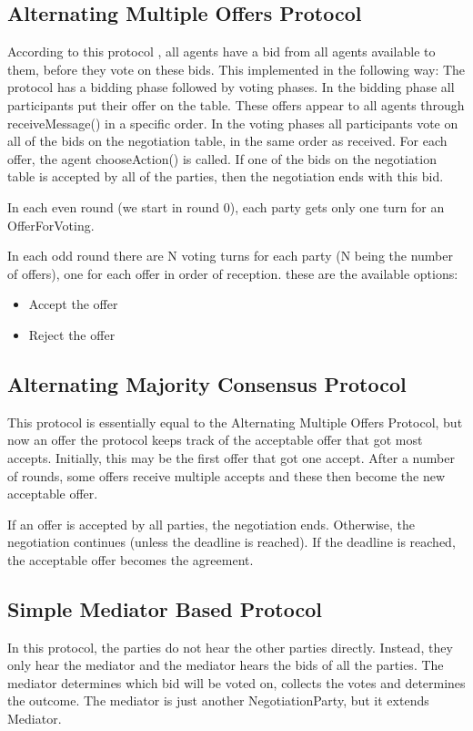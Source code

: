 \documentclass[]{article}
\begin{document}
\subsection{Alternating Multiple Offers Protocol}
According to this protocol \cite{MultilateralOffersProtocols} , all agents have a bid from all agents available to them, before they vote on these bids. This implemented in the following way: The protocol has a bidding phase followed by voting phases. In the bidding phase all participants put their offer on the table. These offers appear to all agents through receiveMessage() in a specific order. In the voting phases all participants vote on all of the bids on the negotiation table, in the same order as received. For each offer, the agent chooseAction() is called. If one of the bids on the negotiation table is accepted by all of the parties, then the negotiation ends with this bid. 

In each even round (we start in round 0), each party gets only one turn for an OfferForVoting. 

In each odd round there are N voting turns for each party (N being the number of offers), one for each offer in order of reception. these are the available options:
\begin{itemize}
\item Accept the offer
\item Reject the offer
\end{itemize}


\subsection{Alternating Majority Consensus Protocol}

This protocol is essentially equal to the Alternating Multiple Offers Protocol, but now an offer the protocol keeps track of the acceptable offer that got most accepts.
Initially, this may be the first offer that got one accept. After a number of rounds, some offers receive multiple accepts and these then become the new acceptable offer.

If an offer is accepted by all parties, the negotiation ends. Otherwise, the negotiation continues (unless the deadline is reached). If the deadline is reached, the acceptable offer becomes the agreement.
 
 
\subsection{Simple Mediator Based Protocol}
In this protocol, the parties do not hear the other parties directly. Instead, they only hear the mediator and the mediator hears the bids of all the parties. The mediator determines which bid will be voted on, collects the votes and determines the outcome. The mediator is just another NegotiationParty, but it extends Mediator.
\end{document}
